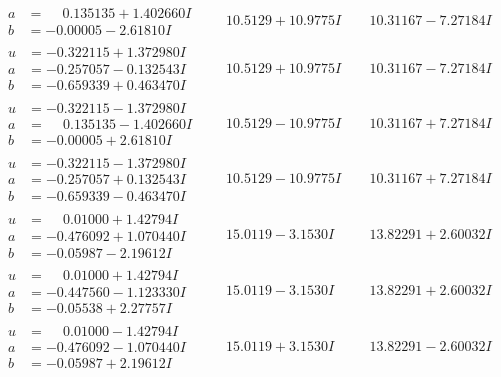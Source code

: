 \documentclass[1p]{elsarticle_modified}
\theoremstyle{definition}
\begin{document}
$$\begin{array}{c|c|c}
\begin{aligned}
a &= \phantom{-}0.135135 + 1.402660 I \\
b &= -0.00005 - 2.61810 I\end{aligned}
 & \phantom{-}10.5129 + 10.9775 I & \phantom{-}10.31167 - 7.27184 I \\ \hline\begin{aligned}
u &= -0.322115 + 1.372980 I \\
a &= -0.257057 - 0.132543 I \\
b &= -0.659339 + 0.463470 I\end{aligned}
 & \phantom{-}10.5129 + 10.9775 I & \phantom{-}10.31167 - 7.27184 I \\ \hline\begin{aligned}
u &= -0.322115 - 1.372980 I \\
a &= \phantom{-}0.135135 - 1.402660 I \\
b &= -0.00005 + 2.61810 I\end{aligned}
 & \phantom{-}10.5129 - 10.9775 I & \phantom{-}10.31167 + 7.27184 I \\ \hline\begin{aligned}
u &= -0.322115 - 1.372980 I \\
a &= -0.257057 + 0.132543 I \\
b &= -0.659339 - 0.463470 I\end{aligned}
 & \phantom{-}10.5129 - 10.9775 I & \phantom{-}10.31167 + 7.27184 I \\ \hline\begin{aligned}
u &= \phantom{-}0.01000 + 1.42794 I \\
a &= -0.476092 + 1.070440 I \\
b &= -0.05987 - 2.19612 I\end{aligned}
 & \phantom{-}15.0119 - 3.1530 I & \phantom{-}13.82291 + 2.60032 I \\ \hline\begin{aligned}
u &= \phantom{-}0.01000 + 1.42794 I \\
a &= -0.447560 - 1.123330 I \\
b &= -0.05538 + 2.27757 I\end{aligned}
 & \phantom{-}15.0119 - 3.1530 I & \phantom{-}13.82291 + 2.60032 I \\ \hline\begin{aligned}
u &= \phantom{-}0.01000 - 1.42794 I \\
a &= -0.476092 - 1.070440 I \\
b &= -0.05987 + 2.19612 I\end{aligned}
 & \phantom{-}15.0119 + 3.1530 I & \phantom{-}13.82291 - 2.60032 I \\ \hline\begin{aligned}

\end{aligned}
\end{array}$$
\end{document}
